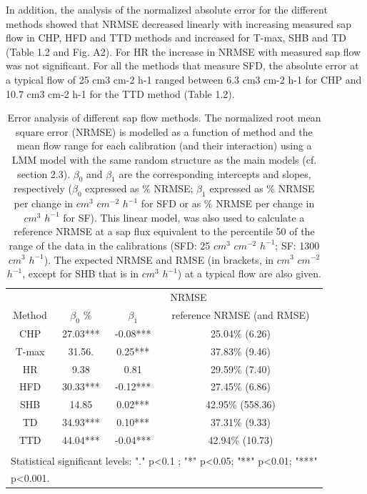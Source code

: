 \documentclass[11pt,twoside]{reedthesis}
\begin{document}
In addition, the analysis of the normalized absolute error for the
different methods showed that NRMSE decreased linearly with increasing
measured sap flow in CHP, HFD and TTD methods and increased for T-max,
SHB and TD (Table 1.2 and Fig. A2). For HR the increase in NRMSE with
measured sap flow was not significant. For all the methods that measure
SFD, the absolute error at a typical flow of 25 cm3 cm-2 h-1 ranged
between 6.3 cm3 cm-2 h-1 for CHP and 10.7 cm3 cm-2 h-1 for the TTD
method (Table 1.2).\par
\begin{table}[!h]

\caption[Error analysis of different sap flow methods.]{\label{tab:Ch2T2}Error analysis of different sap flow methods. The normalized root mean square error (NRMSE) is modelled as a function of method and the mean flow range for each calibration (and their interaction) using a LMM model with the same random structure as the main models (cf. section 2.3). $\beta_0$ and $\beta_1$ are the corresponding intercepts and slopes, respectively ($\beta_0$ expressed as \% NRMSE; $\beta_1$ expressed as \% NRMSE per change in $cm^3$ $cm^{-2}$ $h^{-1}$ for SFD or as \% NRMSE per change in $cm^3$ $h^{-1}$ for SF). This linear model, was also used to calculate a reference NRMSE at a sap flux equivalent to the percentile 50 of the range of the data in the calibrations (SFD: 25 $cm^3$ $cm^{-2}$ $h^{-1}$; SF: 1300 $cm^3$ $h^{-1}$). The expected NRMSE and RMSE (in brackets, in $cm^3$ $cm^{-2}$ $h^{-1}$, except for SHB that is in $cm^3$ $h^{-1}$) at a typical flow are also given.}
\centering
\fontsize{10}{12}\selectfont
\begin{tabular}[t]{cccc}
\toprule
\multicolumn{1}{c}{ } & \multicolumn{3}{c}{NRMSE} \\
\cmidrule(l{3pt}r{3pt}){2-4}
Method & $\beta_0$\; \% & $\beta_1$ & reference NRMSE (and RMSE)\\
\midrule
CHP & 27.03*** & -0.08*** & 25.04\% (6.26)\\
T-max & 31.56. & 0.25*** & 37.83\% (9.46)\\
HR & 9.38 & 0.81 & 29.59\% (7.40)\\
HFD & 30.33*** & -0.12*** & 27.45\% (6.86)\\
SHB & 14.85 & 0.02*** & 42.95\% (558.36)\\
TD & 34.93*** & 0.10*** & 37.31\% (9.33)\\
TTD & 44.04*** & -0.04*** & 42.94\% (10.73)\\
\bottomrule
\multicolumn{4}{l}{\textsuperscript{} Statistical significant levels: "." p<0.1 ; "*" p<0.05; "**" p<0.01; "***"}\\
\multicolumn{4}{l}{p<0.001.}\\
\end{tabular}
\end{table}
\end{document}
